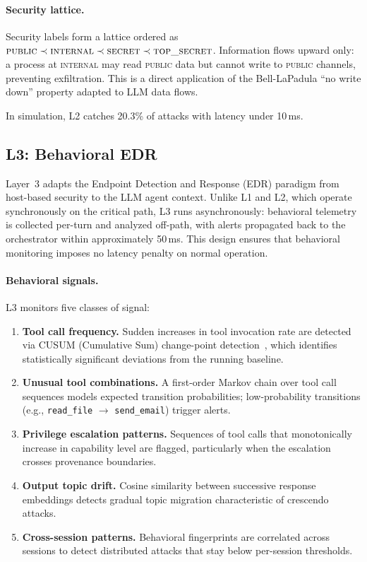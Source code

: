 \paragraph{Security lattice.} Security labels form a lattice ordered as $\textsc{public} \prec \textsc{internal} \prec \textsc{secret} \prec \textsc{top\_secret}$. Information flows upward only: a process at \textsc{internal} may read \textsc{public} data but cannot write to \textsc{public} channels, preventing exfiltration. This is a direct application of the Bell-LaPadula ``no write down'' property adapted to LLM data flows.

In simulation, L2 catches 20.3\% of attacks with latency under 10\,ms.

\subsection{L3: Behavioral EDR}
\label{sec:arch:l3}

Layer~3 adapts the Endpoint Detection and Response (EDR) paradigm from host-based security to the LLM agent context. Unlike L1 and L2, which operate synchronously on the critical path, L3 runs asynchronously: behavioral telemetry is collected per-turn and analyzed off-path, with alerts propagated back to the orchestrator within approximately 50\,ms. This design ensures that behavioral monitoring imposes no latency penalty on normal operation.

\paragraph{Behavioral signals.} L3 monitors five classes of signal:

\begin{enumerate}[leftmargin=*]
\item \textbf{Tool call frequency.} Sudden increases in tool invocation rate are detected via CUSUM (Cumulative Sum) change-point detection~\cite{page1954}, which identifies statistically significant deviations from the running baseline.
\item \textbf{Unusual tool combinations.} A first-order Markov chain over tool call sequences models expected transition probabilities; low-probability transitions (e.g., \texttt{read\_file} $\to$ \texttt{send\_email}) trigger alerts.
\item \textbf{Privilege escalation patterns.} Sequences of tool calls that monotonically increase in capability level are flagged, particularly when the escalation crosses provenance boundaries.
\item \textbf{Output topic drift.} Cosine similarity between successive response embeddings detects gradual topic migration characteristic of crescendo attacks.
\item \textbf{Cross-session patterns.} Behavioral fingerprints are correlated across sessions to detect distributed attacks that stay below per-session thresholds.
\end{enumerate}

